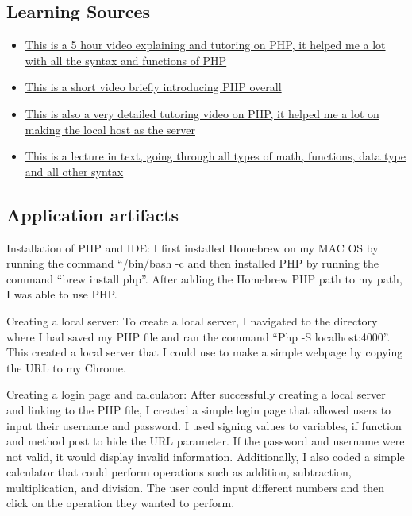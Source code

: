\documentclass[a4paper, 11pt]{report}
\begin{document}
\subsection{Learning Sources}
\begin{itemize}
  \item \href{https://www.youtube.com/watch?v=OK_JCtrrv-c&t=2640s}{This is a 5 hour video explaining and tutoring on PHP, it helped me a lot with all the syntax and functions of PHP}
  \item \href{https://www.youtube.com/watch?v=a7_WFUlFS94}{This is a short video briefly introducing PHP overall}
  \item \href{https://www.bilibili.com/video/BV18x411H7qD/?spm_id_from=333.337.search-card.all.click}{This is also a very detailed tutoring video on PHP, it helped me a lot on making the local host as the server}
  \item \href{https://www.w3schools.com/php/php_math.asp}{This is a lecture in text, going through all types of math, functions, data type and all other syntax}
\end{itemize}




\newpage
\subsection{Application artifacts}

Installation of PHP and IDE:
I first installed Homebrew on my MAC OS by running the command “/bin/bash -c and then installed PHP by running the command “brew install php”. After adding the Homebrew PHP path to my path, I was able to use PHP.

Creating a local server:
To create a local server, I navigated to the directory where I had saved my PHP file and ran the command “Php -S localhost:4000”. This created a local server that I could use to make a simple webpage by copying the URL to my Chrome.

Creating a login page and calculator:
After successfully creating a local server and linking to the PHP file, I created a simple login page that allowed users to input their username and password. I used signing values to variables, if function and method post to hide the URL parameter. If the password and username were not valid, it would display invalid information. Additionally, I also coded a simple calculator that could perform operations such as addition, subtraction, multiplication, and division. The user could input different numbers and then click on the operation they wanted to perform.
\end{document}
